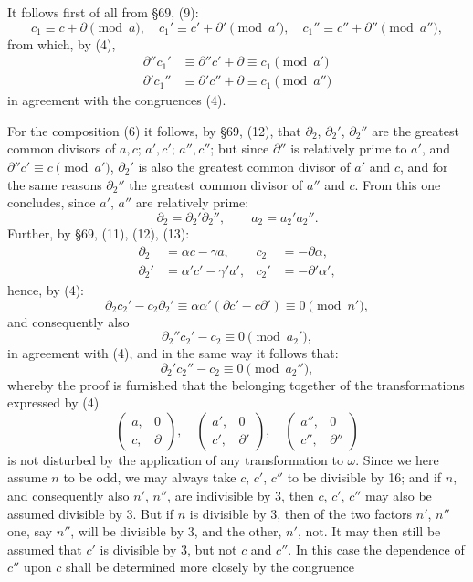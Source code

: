It follows first of all from \S 69, (9):
\[
c_1 \equiv c+\partial \pmod{a}, \quad c_1' \equiv c'+\partial' \pmod{a'}, \quad c_1'' \equiv c''+\partial'' \pmod{a''},
\]
from which, by (4),
\[
\begin{aligned}
\partial''c_1' &\equiv \partial''c' + \partial \equiv c_1 \pmod{a'}\\
\partial'c_1'' &\equiv \partial'c'' + \partial \equiv c_1 \pmod{a''}
\end{aligned}
\]
in agreement with the congruences (4).

For the composition (6) it follows, by \S 69, (12), that
$\partial_2$, $\partial_2'$, $\partial_2''$ are the greatest common divisors of $a,c$;
$a',c'$; $a'',c''$; but since $\partial''$ is relatively prime to $a'$, and
$\partial''c' \equiv c \pmod{a'}$, $\partial_2'$ is also the greatest common
divisor of $a'$ and $c$, and for the same reasons $\partial_2''$ the greatest
common divisor of $a''$ and $c$. From this one concludes, since
$a'$, $a''$ are relatively prime:
\[
\partial_2 = \partial_2'\partial_2'', \qquad a_2 = a_2'a_2''.
\]
Further, by \S 69, (11), (12), (13):
\[
\begin{aligned}
\partial_2 &= \alpha c - \gamma a, & c_2 &= -\partial\alpha,\\
\partial_2' &= \alpha'c' - \gamma'a', & c_2' &= -\partial'\alpha',
\end{aligned}
\]
hence, by (4):
\[
\partial_2c_2' - c_2\partial_2' \equiv \alpha\alpha'(\partial c' - c\partial') \equiv 0 \pmod{n'},
\]
and consequently also
\[
\partial_2''c_2' - c_2 \equiv 0 \pmod{a_2'},
\]
in agreement with (4), and in the same way it follows that:
\[
\partial_2'c_2'' - c_2 \equiv 0 \pmod{a_2''},
\]
whereby the proof is furnished that the belonging together of the
transformations expressed by (4)
\[
\begin{pmatrix} a, & 0\\ c, & \partial \end{pmatrix}, \quad
\begin{pmatrix} a', & 0\\ c', & \partial' \end{pmatrix}, \quad
\begin{pmatrix} a'', & 0\\ c'', & \partial'' \end{pmatrix}
\]
is not disturbed by the application of any  transformation to $\omega$.
Since we here assume $n$ to be odd, we may always take $c$, $c'$, $c''$
to be divisible by 16; and if $n$, and consequently also $n'$, $n''$, are
indivisible by 3, then $c$, $c'$, $c''$ may also be assumed divisible by 3.
But if $n$ is divisible by 3, then of the two factors $n'$, $n''$ one, say
$n''$, will be divisible by 3, and the other, $n'$, not. It may then still
be assumed that $c'$ is divisible by 3, but not $c$ and $c''$.
In this case the dependence of $c''$ upon $c$ shall be determined
more closely by the congruence
